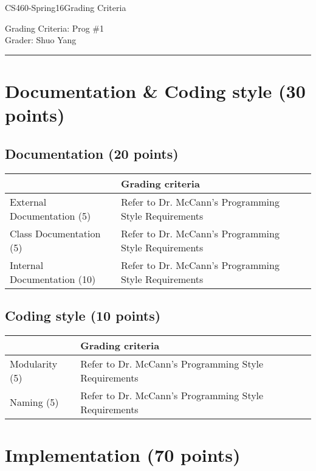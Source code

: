 \documentclass[10pt]{article}
\def\CourseCode{CS460-Spring16}
\def\Category{Grading Criteria}
\def\ProgNo{1}
\def\Grader{Shuo Yang}
\begin{document}
\noindent

\CourseCode \hfill \Category

\begin{center}
Grading Criteria: Prog \#\ProgNo\\
Grader: \Grader\\
\end{center}

\hrule\smallskip

\section{Documentation \& Coding style (30 points)}

\subsection{Documentation (20 points)}

\begin{tabular}{ | l | l | l | }
  \hline
  & Grading criteria \\ \hline
  External Documentation (5) & Refer to Dr. McCann's Programming Style
  Requirements\\ \hline
  Class Documentation (5) & Refer to Dr. McCann's Programming Style
  Requirements \\ \hline
  Internal Documentation (10) & Refer to Dr. McCann's Programming Style
  Requirements \\ \hline
\end{tabular}

\subsection{Coding style (10 points)}

\begin{tabular}{ | l | l | l | }
  \hline
  & Grading criteria \\ \hline
  Modularity (5) & Refer to Dr. McCann's Programming Style
  Requirements \\ \hline
  Naming (5) & Refer to Dr. McCann's Programming Style
  Requirements \\ \hline
\end{tabular}

\section{Implementation (70 points)}
\end{document}

